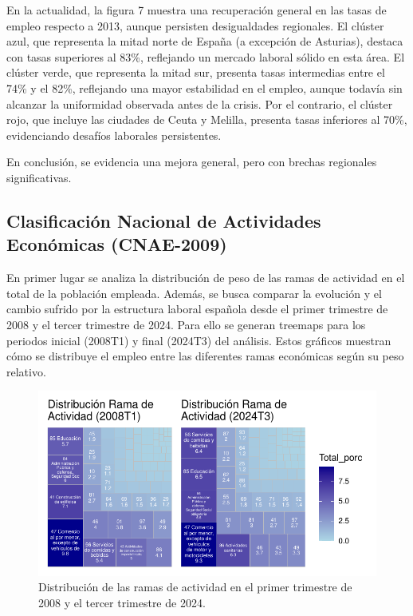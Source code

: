 \documentclass[Universitat de
València,article,submit,moreauthors,pdftex]{Definitions/mdpi}
\begin{document}
En la actualidad, la figura 7 muestra una recuperación general en las
tasas de empleo respecto a 2013, aunque persisten desigualdades
regionales. El clúster azul, que representa la mitad norte de España (a
excepción de Asturias), destaca con tasas superiores al 83\%, reflejando
un mercado laboral sólido en esta área. El clúster verde, que representa
la mitad sur, presenta tasas intermedias entre el 74\% y el 82\%,
reflejando una mayor estabilidad en el empleo, aunque todavía sin
alcanzar la uniformidad observada antes de la crisis. Por el contrario,
el clúster rojo, que incluye las ciudades de Ceuta y Melilla, presenta
tasas inferiores al 70\%, evidenciando desafíos laborales persistentes.

En conclusión, se evidencia una mejora general, pero con brechas
regionales significativas.

\subsection{\texorpdfstring{\textbf{Clasificación Nacional de
Actividades Económicas
(CNAE-2009)}}{Clasificación Nacional de Actividades Económicas (CNAE-2009)}}\label{clasificaciuxf3n-nacional-de-actividades-econuxf3micas-cnae-2009-1}

En primer lugar se analiza la distribución de peso de las ramas de
actividad en el total de la población empleada. Además, se busca
comparar la evolución y el cambio sufrido por la estructura laboral
española desde el primer trimestre de 2008 y el tercer trimestre de
2024. Para ello se generan treemaps para los periodos inicial (2008T1) y
final (2024T3) del análisis. Estos gráficos muestran cómo se distribuye
el empleo entre las diferentes ramas económicas según su peso relativo.

\begin{figure}

{\centering \includegraphics{ProyectoAED2024_files/figure-latex/unnamed-chunk-38-1} 

}

\caption{Distribución de las ramas de actividad en el primer trimestre de 2008 y el tercer trimestre de 2024.}\label{fig:unnamed-chunk-38}
\end{figure}
\end{document}
